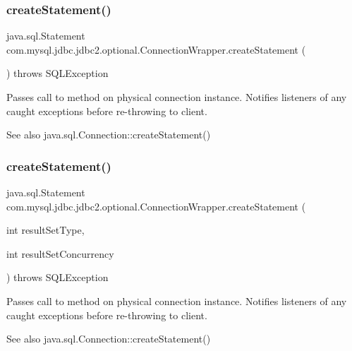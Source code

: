 \subsubsection{\texorpdfstring{create\+Statement()}{createStatement()}\hspace{0.1cm}{\footnotesize\ttfamily [1/3]}}
{\footnotesize\ttfamily java.\+sql.\+Statement com.\+mysql.\+jdbc.\+jdbc2.\+optional.\+Connection\+Wrapper.\+create\+Statement (\begin{DoxyParamCaption}{ }\end{DoxyParamCaption}) throws S\+Q\+L\+Exception}

Passes call to method on physical connection instance. Notifies listeners of any caught exceptions before re-\/throwing to client.

\begin{DoxySeeAlso}{See also}
java.\+sql.\+Connection\+::create\+Statement() 
\end{DoxySeeAlso}
\mbox{\label{classcom_1_1mysql_1_1jdbc_1_1jdbc2_1_1optional_1_1_connection_wrapper_a8e4b2872dce968661546b501281b2639}} 
\subsubsection{\texorpdfstring{create\+Statement()}{createStatement()}\hspace{0.1cm}{\footnotesize\ttfamily [2/3]}}
{\footnotesize\ttfamily java.\+sql.\+Statement com.\+mysql.\+jdbc.\+jdbc2.\+optional.\+Connection\+Wrapper.\+create\+Statement (\begin{DoxyParamCaption}\item[{int}]{result\+Set\+Type,  }\item[{int}]{result\+Set\+Concurrency }\end{DoxyParamCaption}) throws S\+Q\+L\+Exception}

Passes call to method on physical connection instance. Notifies listeners of any caught exceptions before re-\/throwing to client.

\begin{DoxySeeAlso}{See also}
java.\+sql.\+Connection\+::create\+Statement() 
\end{DoxySeeAlso}
\mbox{\label{classcom_1_1mysql_1_1jdbc_1_1jdbc2_1_1optional_1_1_connection_wrapper_a6ac78197446ec43a108c5f6bd66fa1e1}} 
